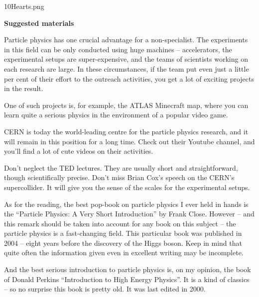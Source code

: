 {%
}{10Hearts.png}


\thispagestyle{fancy}
\fancyhf{}
\renewcommand{\headrulewidth}{0pt}
\fancyfoot{}
{\huge{\textbf{Suggested materials}}}
\vskip12pt

Particle physics has one crucial advantage for a non-specialist. The experiments in this field can be only conducted using huge machines -- accelerators, the experimental setups are super-expensive, and the teams of scientists working on each research are large. In these circumstances, if the team put even just a little per cent of their effort to the outreach activities, you get a lot of exciting projects in the result.

One of such projects is, for example, the ATLAS Minecraft map, where you can learn quite a serious physics in the environment of a popular video game.

CERN is today the world-leading centre for the particle physics research, and it will remain in this position for a long time. Check out their Youtube channel, and you'll find a lot of cute videos on their activities.

Don't neglect the TED lectures. They are usually short and straightforward, though scientifically precise. Don't miss Brian Cox's speech on the CERN's supercollider. It will give you the sense of the scales for the experimental setups.

As for the reading, the best pop-book on particle physics I ever held in hands is the ``Particle Physics: A Very Short Introduction'' by Frank Close. However -- and this remark should be taken into account for any book on this subject -- the particle physics is a fast-changing field. This particular book was published in 2004 -- eight years before the discovery of the Higgs boson. Keep in mind that quite often the information given even in excellent writing may be incomplete.

And the best serious introduction to particle physics is, on my opinion, the book of Donald Perkins ``Introduction to High Energy Physics''. It is a kind of classics -- so no surprise this book is pretty old. It was last edited in 2000.

\newpage
